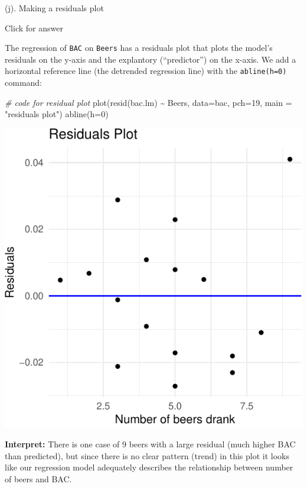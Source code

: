 \documentclass[
]{book}
\newenvironment{Shaded}{\begin{snugshade}}{\end{snugshade}}
\newcommand{\AttributeTok}[1]{\textcolor[rgb]{0.77,0.63,0.00}{#1}}
\newcommand{\CommentTok}[1]{\textcolor[rgb]{0.56,0.35,0.01}{\textit{#1}}}
\newcommand{\DecValTok}[1]{\textcolor[rgb]{0.00,0.00,0.81}{#1}}
\newcommand{\FunctionTok}[1]{\textcolor[rgb]{0.00,0.00,0.00}{#1}}
\newcommand{\NormalTok}[1]{#1}
\newcommand{\SpecialCharTok}[1]{\textcolor[rgb]{0.00,0.00,0.00}{#1}}
\newcommand{\StringTok}[1]{\textcolor[rgb]{0.31,0.60,0.02}{#1}}
\begin{document}
(j). Making a residuals plot

Click for answer

The regression of \texttt{BAC} on \texttt{Beers} has a residuals plot that plots the model's residuals on the y-axis and the explantory (``predictor'') on the x-axis. We add a horizontal reference line (the detrended regression line) with the \texttt{abline(h=0)} command:

\begin{Shaded}
\begin{Highlighting}[]
\CommentTok{\# code for residual plot}
\FunctionTok{plot}\NormalTok{(}\FunctionTok{resid}\NormalTok{(bac.lm) }\SpecialCharTok{\textasciitilde{}}\NormalTok{ Beers, }\AttributeTok{data=}\NormalTok{bac, }\AttributeTok{pch=}\DecValTok{19}\NormalTok{, }\AttributeTok{main =} \StringTok{"residuals plot"}\NormalTok{)  }
\FunctionTok{abline}\NormalTok{(}\AttributeTok{h=}\DecValTok{0}\NormalTok{)}
\end{Highlighting}
\end{Shaded}

\includegraphics[width=1\linewidth]{Class_Activity_6_files/figure-latex/unnamed-chunk-12-1}

\textbf{Interpret:} There is one case of 9 beers with a large residual (much higher BAC than predicted), but since there is no clear pattern (trend) in this plot it looks like our regression model adequately describes the relationship between number of beers and BAC.
\end{document}
